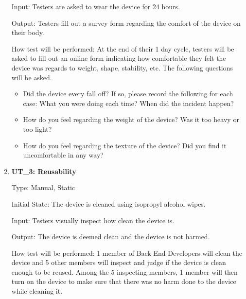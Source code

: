 \documentclass[12pt, titlepage]{article}
\begin{document}
\begin{enumerate}
Input: Testers are asked to wear the device for 24 hours.
					
Output: Testers fill out a survey form regarding the comfort of the device on their body.
					
How test will be performed: At the end of their 1 day cycle, testers will be asked to fill out an online form indicating how comfortable they felt the device was regards to weight, shape, stability, etc. The following questions will be asked.

\begin{itemize}
\item Did the device every fall off? If so, please record the following for each case: What you were doing each time? When did the incident happen?
\item How do you feel regarding the weight of the device? Was it too heavy or too light?
\item How do you feel regarding the texture of the device? Did you find it uncomfortable in any way?
\end{itemize}

\item\textbf{{UT\_3: Reusability\\}}\label{UT3}

Type: Manual, Static
					
Initial State: The device is cleaned using isopropyl alcohol wipes.
					
Input: Testers visually inspect how clean the device is.
					
Output: The device is deemed clean and the device is not harmed.
					
How test will be performed: 1 member of Back End Developers will clean the device and 5 other members will inspect and judge if the device is clean enough to be reused. Among the 5 inspecting members, 1 member will then turn on the device to make sure that there was no harm done to the device while cleaning it.

\end{enumerate}
\end{document}
